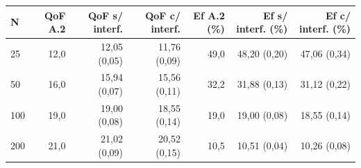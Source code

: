 \begin{tabular}{lrrrrrr}
\toprule
N & QoF A.2 & QoF s/ interf. & QoF c/ interf. & Ef A.2 (\%) & Ef s/ interf. (\%) & Ef c/ interf. (\%) \\
\midrule
25 & 12{,}0 & 12{,}05 (0{,}05) & 11{,}76 (0{,}09) & 49{,}0 & 48{,}20 (0{,}20) & 47{,}06 (0{,}34) \\
50 & 16{,}0 & 15{,}94 (0{,}07) & 15{,}56 (0{,}11) & 32{,}2 & 31{,}88 (0{,}13) & 31{,}12 (0{,}22) \\
100 & 19{,}0 & 19{,}00 (0{,}08) & 18{,}55 (0{,}14) & 19{,}0 & 19{,}00 (0{,}08) & 18{,}55 (0{,}14) \\
200 & 21{,}0 & 21{,}02 (0{,}09) & 20{,}52 (0{,}15) & 10{,}5 & 10{,}51 (0{,}04) & 10{,}26 (0{,}08) \\
\bottomrule
\end{tabular}
